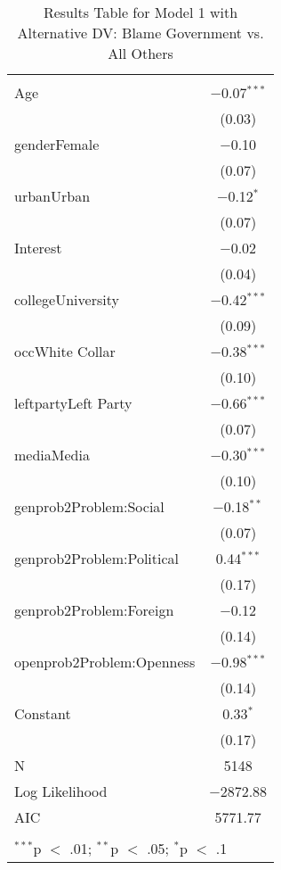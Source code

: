 
\begin{table}[!htbp] \centering 
  \caption{Results Table for Model 1 with Alternative DV: Blame Government vs. All Others} 
  \label{} 
\footnotesize 
\begin{tabular}{@{\extracolsep{5pt}}lc} 
\\[-1.8ex]\hline \\[-1.8ex] 
\hline \\[-1.8ex] 
 Age & $-$0.07$^{***}$ \\ 
  & (0.03) \\ 
  genderFemale & $-$0.10 \\ 
  & (0.07) \\ 
  urbanUrban & $-$0.12$^{*}$ \\ 
  & (0.07) \\ 
  Interest & $-$0.02 \\ 
  & (0.04) \\ 
  collegeUniversity & $-$0.42$^{***}$ \\ 
  & (0.09) \\ 
  occWhite Collar & $-$0.38$^{***}$ \\ 
  & (0.10) \\ 
  leftpartyLeft Party & $-$0.66$^{***}$ \\ 
  & (0.07) \\ 
  mediaMedia & $-$0.30$^{***}$ \\ 
  & (0.10) \\ 
  genprob2Problem:Social & $-$0.18$^{**}$ \\ 
  & (0.07) \\ 
  genprob2Problem:Political & 0.44$^{***}$ \\ 
  & (0.17) \\ 
  genprob2Problem:Foreign & $-$0.12 \\ 
  & (0.14) \\ 
  openprob2Problem:Openness & $-$0.98$^{***}$ \\ 
  & (0.14) \\ 
  Constant & 0.33$^{*}$ \\ 
  & (0.17) \\ 
 N & 5148 \\ 
Log Likelihood & $-$2872.88 \\ 
AIC & 5771.77 \\ 
\hline \\[-1.8ex] 
\multicolumn{2}{l}{$^{***}$p $<$ .01; $^{**}$p $<$ .05; $^{*}$p $<$ .1} \\ 
\end{tabular} 
\end{table} 
